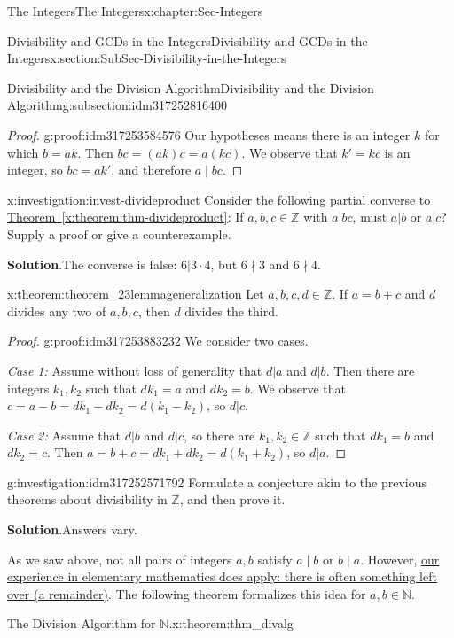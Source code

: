 \documentclass[oneside,10pt,]{book}
\newcommand{\blocktitlefont}{\relax}
\newcommand{\xreffont}{\relax}
\numberwithin{equation}{section}
\def\Z{{\mathbb Z}}
\def\N{{\mathbb N}}
\begin{document}
\begin{chapterptx}{The Integers}{}{The Integers}{}{}{x:chapter:Sec-Integers}
\begin{sectionptx}{Divisibility and GCDs in the Integers}{}{Divisibility and GCDs in the Integers}{}{}{x:section:SubSec-Divisibility-in-the-Integers}
\begin{subsectionptx}{Divisibility and the Division Algorithm}{}{Divisibility and the Division Algorithm}{}{}{g:subsection:idm317252816400}
\begin{proof}{}{g:proof:idm317253584576}
Our hypotheses means there is an integer \(k\) for which \(b = ak\). Then \(bc = (ak)c = a(kc)\). We observe that \(k' = kc\) is an integer, so \(bc = ak'\), and therefore \(a\mid bc\).%
\end{proof}
\begin{investigation}{}{x:investigation:invest-divideproduct}%
Consider the following partial converse to \hyperref[x:theorem:thm-divideproduct]{Theorem~{\xreffont\ref{x:theorem:thm-divideproduct}}}: If \(a,b,c\in\Z\) with \(a|bc\), must \(a|b\) or \(a|c\)? Supply a proof or give a counterexample.%
\par\smallskip%
\noindent\textbf{\blocktitlefont Solution}.\hypertarget{g:solution:idm317253722192}{}\quad{}The converse is false: \(6| 3\cdot 4\), but \(6\nmid 3\) and \(6\nmid 4\).%
\end{investigation}
\begin{theorem}{}{}{x:theorem:theorem_23lemmageneralization}%
Let \(a,b,c,d\in \Z\). If \(a = b+c\) and \(d\) divides any two of \(a,b,c\), then \(d\) divides the third.%
\end{theorem}
\begin{proof}{}{g:proof:idm317253883232}
We consider two cases.%
\par
\emph{Case 1:} Assume without loss of generality that \(d|a\) and \(d|b\). Then there are integers \(k_1, k_2\) such that \(d k_1 = a\) and \(d k_2 = b\). We observe that \(c = a - b = d k_1 - d k_2 = d(k_1 - k_2)\), so \(d|c\).%
\par
\emph{Case 2:} Assume that \(d| b\) and \(d|c\), so there are \(k_1,k_2\in \Z\) such that \(d k_1 = b\) and \(d k_2 = c\). Then \(a = b+ c = dk_1 + dk_2 = d(k_1 + k_2)\), so \(d|a\).%
\end{proof}
\begin{investigation}{}{g:investigation:idm317252571792}%
Formulate a conjecture akin to the previous theorems about divisibility in \(\Z\), and then prove it.%
\par\smallskip%
\noindent\textbf{\blocktitlefont Solution}.\hypertarget{g:solution:idm317252601152}{}\quad{}Answers vary.%
\end{investigation}
As we saw above, not all pairs of integers \(a,b\) satisfy \(a\mid b\) or \(b\mid a\). However, \href{http://www.corestandards.org/Math/Content/4/NBT/B/6/}{our experience in elementary mathematics does apply: there is often something left over (a remainder)}. The following theorem formalizes this idea for \(a,b\in \N\).%
\begin{theorem}{The Division Algorithm for \(\N\).}{}{x:theorem:thm_divalg}%

\end{theorem}
\end{subsectionptx}
\end{sectionptx}
\end{chapterptx}
\end{document}
